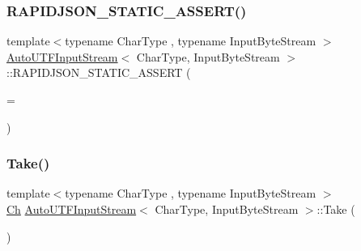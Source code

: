 \mbox{\label{classAutoUTFInputStream_a74f5efc9cfc9e9978d81a3282abf17da}} 
\subsubsection{\texorpdfstring{R\+A\+P\+I\+D\+J\+S\+O\+N\+\_\+\+S\+T\+A\+T\+I\+C\+\_\+\+A\+S\+S\+E\+R\+T()}{RAPIDJSON\_STATIC\_ASSERT()}}
{\footnotesize\ttfamily template$<$typename Char\+Type , typename Input\+Byte\+Stream $>$ \\
\hyperlink{classAutoUTFInputStream}{Auto\+U\+T\+F\+Input\+Stream}$<$ Char\+Type, Input\+Byte\+Stream $>$\+::R\+A\+P\+I\+D\+J\+S\+O\+N\+\_\+\+S\+T\+A\+T\+I\+C\+\_\+\+A\+S\+S\+E\+RT (\begin{DoxyParamCaption}\item[{sizeof(typename Input\+Byte\+Stream\+::\+Ch)}]{ = {} }\end{DoxyParamCaption})\hspace{0.3cm}{\ttfamily [private]}}

\mbox{\label{classAutoUTFInputStream_a652cd1ae8bd848a5ecce4efa1ebd0f38}} 
\subsubsection{\texorpdfstring{Take()}{Take()}}
{\footnotesize\ttfamily template$<$typename Char\+Type , typename Input\+Byte\+Stream $>$ \\
\hyperlink{classAutoUTFInputStream_a3bb3eb46f2c20404a7ac21963cfe348f}{Ch} \hyperlink{classAutoUTFInputStream}{Auto\+U\+T\+F\+Input\+Stream}$<$ Char\+Type, Input\+Byte\+Stream $>$\+::Take (\begin{DoxyParamCaption}{ }\end{DoxyParamCaption})\hspace{0.3cm}{\ttfamily [inline]}}

